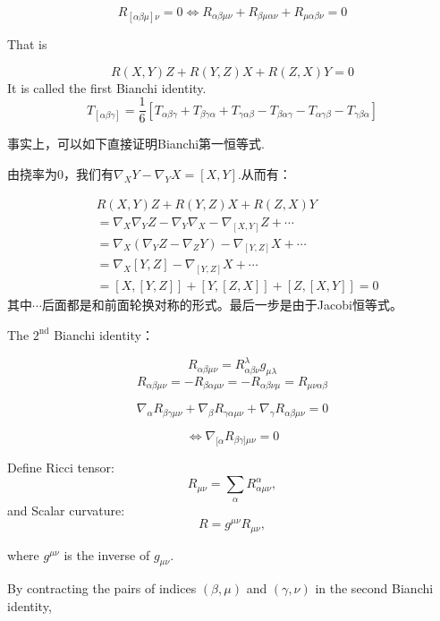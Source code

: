 \[
R_{[\alpha\beta\mu]\nu} = 0 \iff R_{\alpha\beta\mu\nu} + R_{\beta\mu\alpha\nu} + R_{\mu\alpha\beta\nu} = 0
\]

That is

\[
R(X, Y) Z + R(Y, Z) X + R(Z, X) Y = 0
\]
It is called the first Bianchi identity.
\[
T_{[\alpha\beta\gamma]} = \frac{1}{6} [T_{\alpha\beta\gamma} + T_{\beta\gamma\alpha} + T_{\gamma\alpha\beta} - T_{\beta\alpha\gamma} - T_{\alpha\gamma\beta} - T_{\gamma\beta\alpha}]
\]
\begin{remark}
    事实上，可以如下直接证明Bianchi第一恒等式.

    由挠率为$0$，我们有$\nabla_X Y-\nabla_Y X=[X,Y].$从而有：
    
\begin{equation*}
    \begin{aligned}
        &R(X,Y)Z+R(Y,Z)X+R(Z,X)Y\\
        &=\nabla_X\nabla_Y Z-\nabla_Y \nabla_X-\nabla_{[X,Y]}Z+\cdots\\
        &=\nabla_X(\nabla_Y Z-\nabla_Z Y)-\nabla_{[Y,Z]}X+\cdots\\
        &=\nabla_X[Y,Z]-\nabla_{[Y,Z]}X+\cdots\\
        &=[X,[Y,Z]]+[Y,[Z,X]]+[Z,[X,Y]]=0
    \end{aligned}
\end{equation*}
其中$\cdots$后面都是和前面轮换对称的形式。最后一步是由于Jacobi恒等式。

    
\end{remark}



The \(2^{\text{nd}}\) Bianchi identity：

\[
R_{\alpha\beta\mu\nu} = R_{\alpha\beta\nu}^\lambda g_{\mu\lambda}
\]
\[
R_{\alpha\beta\mu\nu} = - R_{\beta\alpha\mu\nu} = - R_{\alpha\beta\nu\mu} = R_{\mu\nu\alpha\beta}
\]

\[
\nabla_\alpha R_{\beta\gamma\mu\nu} + \nabla_\beta R_{\gamma\alpha\mu\nu} + \nabla_\gamma R_{\alpha\beta\mu\nu} = 0
\]

\[
\Leftrightarrow \nabla_{[\alpha} R_{\beta\gamma]\mu\nu} = 0
\]

Define Ricci tensor:\[R_{\mu\nu} = \sum_\alpha R_{\alpha\mu\nu}^{\alpha}  ,\]
and Scalar curvature:
\[
R = g^{\mu\nu} R_{\mu\nu} ,
\]

where \( g^{\mu\nu} \) is the inverse of \( g_{\mu\nu} \).

By contracting the pairs of indices \( (\beta, \mu) \) and \( (\gamma, \nu) \) in the second Bianchi identity,

